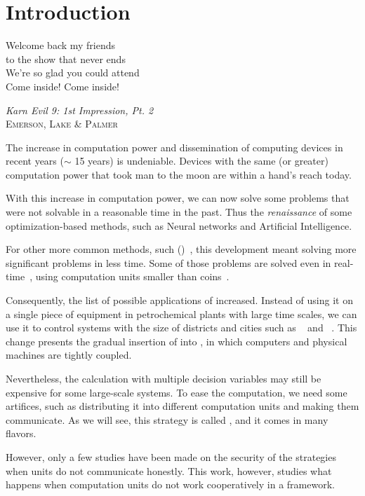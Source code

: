 \documentclass[../main.tex]{subfiles}
\begin{document}
\chapter{Introduction}\label{sec:introduction}
\epigraph{\centering Welcome back my friends\\ to the show that never ends\\
We’re so glad you could attend\\ Come inside! Come inside!}
{\textit{Karn Evil 9: 1st Impression, Pt. 2}\\\textsc{Emerson, Lake \& Palmer}}

The increase in computation power and dissemination of computing devices in recent years ($\sim$ 15 years) is undeniable.
Devices with the same (or greater) computation power that took man to the moon are within a hand's reach today.

With this increase in computation power, we can now solve some problems that were not solvable in a reasonable time in the past. Thus the \emph{renaissance} of some optimization-based methods, such as Neural networks and Artificial Intelligence.

For other more common methods, such \mpclong{} (\mpcshort)~\cite{GarciaEtAl1989}, this development meant solving more significant problems in less time. Some of those problems are solved even in real-time~\cite{BesselmannEtAl2008}, using computation units smaller than coins~\cite{BanguraMahony2014}.

Consequently, the list of possible applications of \mpc{} increased. Instead of using it on a single piece of equipment in petrochemical plants with large time scales, we can use it to control systems with the size of districts and cities such as \wdns~\cite{ZhangEtAl2021} and \dhns~\cite{TaylorEtAl2021}.
This change presents the gradual insertion of \mpc{} into \cps{}, in which computers and physical machines are tightly coupled.

Nevertheless, the calculation with multiple decision variables may still be expensive for some large-scale systems. To ease the computation, we need some artifices, such as distributing it into different computation units and making them communicate.
As we will see, this strategy is called \dmpc{}, and it comes in many flavors.

However, only a few studies have been made on the security of the \dmpc{} strategies when units do not communicate honestly.
This work, however, studies what happens when computation units do not work cooperatively in a \dmpc{} framework.
\end{document}
